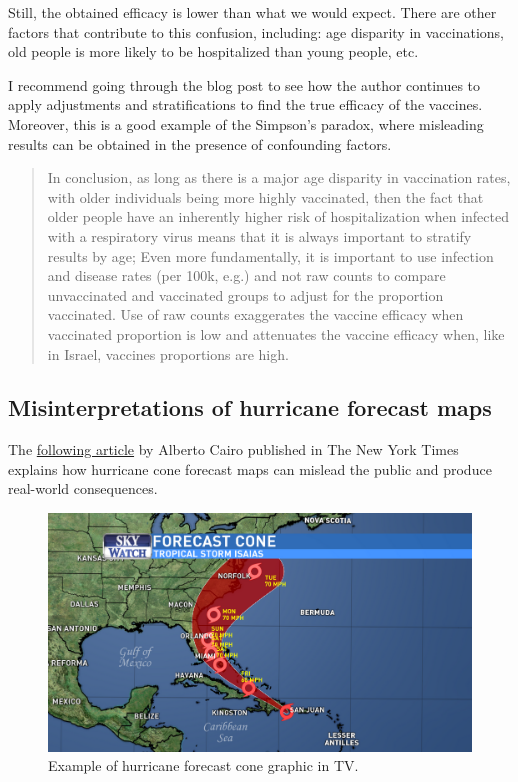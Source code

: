 \documentclass[
]{book}
\begin{document}
Still, the obtained efficacy is lower than what we would expect. There are other factors that contribute to this confusion, including: age disparity in vaccinations, old people is more likely to be hospitalized than young people, etc.

I recommend going through the blog post to see how the author continues to apply adjustments and stratifications to find the true efficacy of the vaccines. Moreover, this is a good example of the Simpson's paradox, where misleading results can be obtained in the presence of confounding factors.

\begin{quote}
In conclusion, as long as there is a major age disparity in vaccination rates, with older individuals being more highly vaccinated, then the fact that older people have an inherently higher risk of hospitalization when infected with a respiratory virus means that it is always important to stratify results by age; Even more fundamentally, it is important to use infection and disease rates (per 100k, e.g.) and not raw counts to compare unvaccinated and vaccinated groups to adjust for the proportion vaccinated. Use of raw counts exaggerates the vaccine efficacy when vaccinated proportion is low and attenuates the vaccine efficacy when, like in Israel, vaccines proportions are high.
\end{quote}

\hypertarget{viz-hurricane}{%
\subsection{Misinterpretations of hurricane forecast maps}\label{viz-hurricane}}

The \href{https://www.nytimes.com/interactive/2019/08/29/opinion/hurricane-dorian-forecast-map.html}{following article} by Alberto Cairo published in The New York Times explains how hurricane cone forecast maps can mislead the public and produce real-world consequences.

\begin{figure}

{\centering \includegraphics[width=0.66\linewidth]{Figures/hurricane-forecast-maps-tv} 

}

\caption{Example of hurricane forecast cone graphic in TV.}\label{fig:hurricane-tv}
\end{figure}
\end{document}
